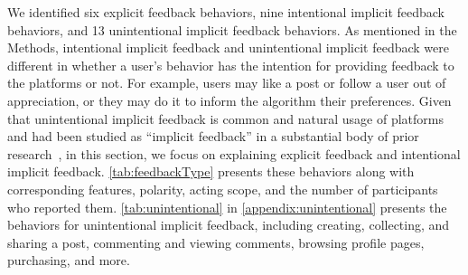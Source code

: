 We identified six explicit feedback behaviors, nine intentional implicit feedback behaviors, and 13 unintentional implicit feedback behaviors. As mentioned in the Methods, intentional implicit feedback and unintentional implicit feedback were different in whether a user's behavior has the intention for providing feedback to the platforms or not. For example, users may like a post or follow a user out of appreciation, or they may do it to inform the algorithm their preferences. Given that unintentional implicit feedback is common and natural usage of platforms and had been studied as ``implicit feedback'' in a substantial body of prior research~\cite{kelly2003implicit,jannach2018recommending}, in this section, we focus on explaining explicit feedback and intentional implicit feedback. \autoref{tab:feedbackType} presents these behaviors along with corresponding features, polarity, acting scope, and the number of participants who reported them. \autoref{tab:unintentional} in \autoref{appendix:unintentional} presents the behaviors for unintentional implicit feedback, including creating, collecting, and sharing a post, commenting and viewing comments, browsing profile pages, purchasing, and more. %

